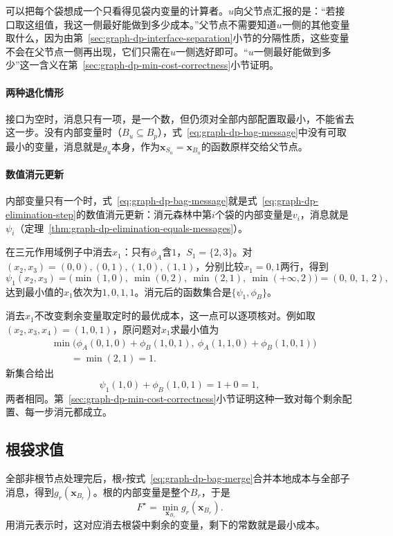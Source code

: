 可以把每个袋想成一个只看得见袋内变量的计算者。$u$向父节点汇报的是：“若接口取这组值，我这一侧最好能做到多少成本。”父节点不需要知道$u$一侧的其他变量取什么，因为由第~\ref{sec:graph-dp-interface-separation}小节的分隔性质，这些变量不会在父节点一侧再出现，它们只需在$u$一侧选好即可。“$u$一侧最好能做到多少”这一含义在第~\ref{sec:graph-dp-min-cost-correctness}小节证明。

\paragraph{两种退化情形}
接口为空时，消息只有一项，是一个数，但仍须对全部内部配置取最小，不能省去这一步。没有内部变量时（$B_u\subseteq B_p$），式~\eqref{eq:graph-dp-bag-message}中没有可取最小的变量，消息就是$g_u$本身，作为$\bm x_{S_u}=\bm x_{B_u}$的函数原样交给父节点。

\paragraph{数值消元更新}
内部变量只有一个时，式~\eqref{eq:graph-dp-bag-message}就是式~\eqref{eq:graph-dp-elimination-step}的数值消元更新：消元森林中第$i$个袋的内部变量是$v_i$，消息就是$\psi_i$（定理~\ref{thm:graph-dp-elimination-equals-messages}）。

在三元作用域例子中消去$x_1$：只有$\phi_A$含$1$，$S_1=\{2,3\}$。对$(x_2,x_3)=(0,0),(0,1),(1,0),(1,1)$，分别比较$x_1=0,1$两行，得到
\[
\psi_1(x_2,x_3)=\bigl(\min(1,0),\ \min(0,2),\ \min(2,1),\ \min(+\infty,2)\bigr)=(0,\,0,\,1,\,2),
\]
达到最小值的$x_1$依次为$1,0,1,1$。消元后的函数集合是$\{\psi_1,\phi_B\}$。

消去$x_1$不改变剩余变量取定时的最优成本，这一点可以逐项核对。例如取$(x_2,x_3,x_4)=(1,0,1)$，原问题对$x_1$求最小值为
\[
\begin{aligned}
&\min\bigl(\phi_A(0,1,0)+\phi_B(1,0,1),\ \phi_A(1,1,0)+\phi_B(1,0,1)\bigr)\\
&\qquad=\min(2,1)=1.
\end{aligned}
\]
新集合给出
\[
\psi_1(1,0)+\phi_B(1,0,1)=1+0=1,
\]
两者相同。第~\ref{sec:graph-dp-min-cost-correctness}小节证明这种一致对每个剩余配置、每一步消元都成立。

\subsection{根袋求值}
\label{sec:graph-dp-root-evaluation}

全部非根节点处理完后，根$r$按式~\eqref{eq:graph-dp-bag-merge}合并本地成本与全部子消息，得到$g_r(\bm x_{B_r})$。根的内部变量是整个$B_r$，于是
\begin{equation}
F^\star=\min_{\bm x_{B_r}}g_r(\bm x_{B_r}).
\label{eq:graph-dp-root-min}
\end{equation}
用消元表示时，这对应消去根袋中剩余的变量，剩下的常数就是最小成本。

